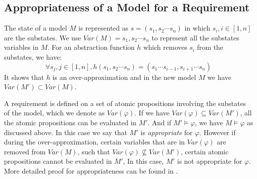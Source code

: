 \subsection{Appropriateness of a Model for a Requirement}
The state of a model $M$ is represented as $s=(s_1,s_2\cdots s_n)$ in which $s_i, i\in [1,n]$ are the substates. We use $Var(M)={s_1,s_2\cdots s_n}$ to represent all the substates variables in $M$. For an abstraction function $h$ which removes $s_i$ from the substates, we have:
$$\forall s_j,j\in [1,n], h(s_1,s_2\cdots s_n)=(s_1\cdots s_{i-1},s_{i+1}\cdots s_n)$$
It shows that $h$ is an over-approximation and in the new model $M$ we have $Var(M')\subset Var(M)$.

A requirement is defined on a set of atomic propositions involving the substates of the model, which we denote as $Var(\varphi)$. If we have $Var(\varphi)\subseteq Var(M')$, all the atomic propositions can be evaluated in $M'$. And if $M'\models \varphi$, we have $M\models\varphi$ as discussed above. In this case we say that $M'$ is \emph{appropriate} for $\varphi$. However if during the over-approximation, certain variables that are in $Var(\varphi)$ are removed from $Var(M)$, such that $Var(\varphi)\not\subseteq Var(M')$, certain atomic propositions cannot be evaluated in $M'$, In this case, $M'$ is not appropriate for $\varphi$. More detailed proof for appropriateness can be found in \cite{regar_tech}.